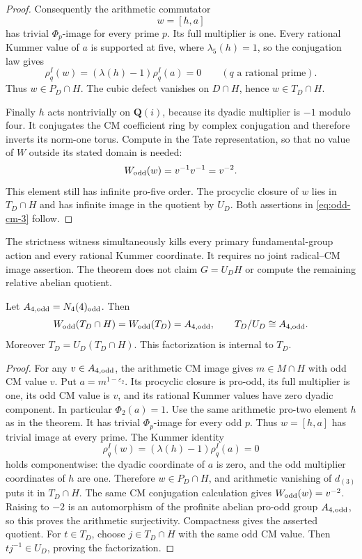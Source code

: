 \begin{proof}
Consequently the arithmetic commutator
\[
                         w=[h,a]
\]
has trivial \(\Phi_p\)-image for every prime \(p\).
Its full multiplier is one.
Every rational Kummer value of \(a\) is supported at five,
where \(\lambda_5(h)=1\), so the conjugation law gives
\[
 \rho_q^I(w)
       =(\lambda(h)-1)\rho_q^I(a)=0
       \qquad(q\text{ a rational prime}).
\]
Thus \(w\in P_D\cap H\).
The cubic defect vanishes on \(D\cap H\), hence
\(w\in T_D\cap H\).

Finally \(h\) acts nontrivially on \(\mathbf Q(i)\), because
its dyadic multiplier is \(-1\) modulo four.
It conjugates the CM coefficient ring by complex conjugation
and therefore inverts its norm-one torus.
Compute in the Tate representation, so that no value
of \(W\) outside its stated domain is needed:
\[
                    W_{\rm odd}(w)=v^{-1}v^{-1}=v^{-2}.
\]
This element still has infinite pro-five order.
The procyclic closure of \(w\) lies in \(T_D\cap H\) and has
infinite image in the quotient by \(U_D\).
Both assertions in \eqref{eq:odd-cm-3} follow.
\end{proof}

\begin{remark}
The strictness witness simultaneously kills every primary
fundamental-group action and every rational Kummer coordinate.
It requires no joint radical--CM image assertion.
The theorem does not claim \(G=U_DH\) or compute the remaining
relative abelian quotient.
\end{remark}

\begin{corollary}\label{cor:full-odd-harmonic-arithmetic-image}
Let \(A_{4,\rm odd}=N_4(4)_{\rm odd}\). Then
\[
 W_{\rm odd}(T_D\cap H)=W_{\rm odd}(T_D)=A_{4,\rm odd},
 \qquad T_D/U_D\cong A_{4,\rm odd}.
\]
Moreover \(T_D=U_D(T_D\cap H)\).
This factorization is internal to \(T_D\).
\end{corollary}
\begin{proof}
For any \(v\in A_{4,\rm odd}\), the arithmetic CM image gives
\(m\in M\cap H\) with odd CM value \(v\).
Put \(a=m^{1-\varepsilon_2}\). Its procyclic closure is pro-odd,
its full multiplier is one, its odd CM value is \(v\), and
its rational Kummer values have zero dyadic component.
In particular \(\Phi_2(a)=1\).
Use the same arithmetic pro-two element \(h\) as in the theorem.
It has trivial \(\Phi_p\)-image for every odd \(p\).
Thus \(w=[h,a]\) has trivial image at every prime.
The Kummer identity
\[
 \rho_q^I(w)=(\lambda(h)-1)\rho_q^I(a)=0
\]
holds componentwise: the dyadic coordinate of \(a\) is zero,
and the odd multiplier coordinates of \(h\) are one.
Therefore \(w\in P_D\cap H\), and arithmetic vanishing of
\(d_{(3)}\) puts it in \(T_D\cap H\).
The same CM conjugation calculation gives
\(W_{\rm odd}(w)=v^{-2}\).
Raising to \(-2\) is an automorphism of the profinite abelian
pro-odd group \(A_{4,\rm odd}\), so this proves the arithmetic
surjectivity. Compactness gives the asserted quotient.
For \(t\in T_D\), choose \(j\in T_D\cap H\) with the same
odd CM value. Then \(tj^{-1}\in U_D\), proving the factorization.
\end{proof}
